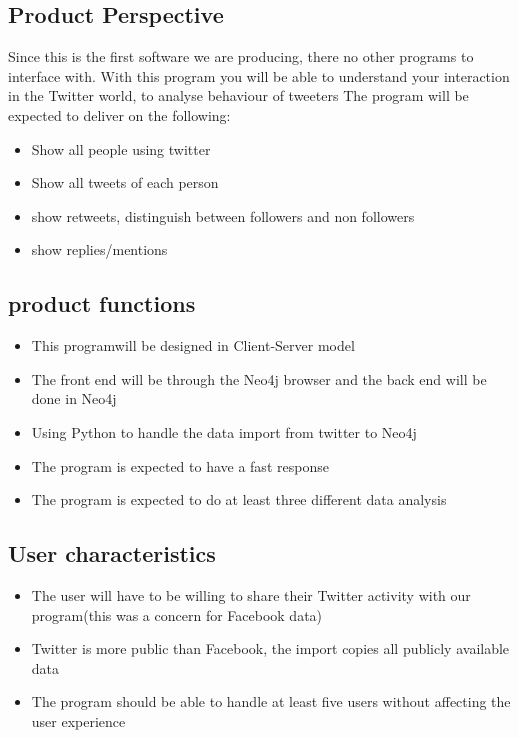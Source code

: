 \documentclass[11pt]{article}
\begin{document}
\subsection{Product Perspective }
Since this is the first software we are producing, there no other programs to interface with. With this program you will be able to understand your interaction in the Twitter world, to analyse behaviour of tweeters
The program will be expected to deliver on the following:
\begin{itemize}
\item Show all people using twitter
\item Show all tweets of each person
\item show retweets, distinguish between followers and non followers
\item show replies/mentions
\end{itemize}

\subsection{product functions}
\begin{itemize}
\item This programwill be designed in Client-Server model
\item The front end will  be through the Neo4j browser and the back end will be done in Neo4j
\item Using Python to handle the data import from twitter to Neo4j
\item The program is expected to have a fast response 
\item The program is expected to do at least three different data analysis
\end{itemize}

\subsection{User characteristics}
\begin{itemize}
\item The user will have to be willing to share their Twitter activity with our program(this was a concern for Facebook data)
\item Twitter is more public than Facebook, the import copies all publicly available data
\item The program should be able to handle at least five users without affecting the user experience
\end{itemize}
\end{document}
